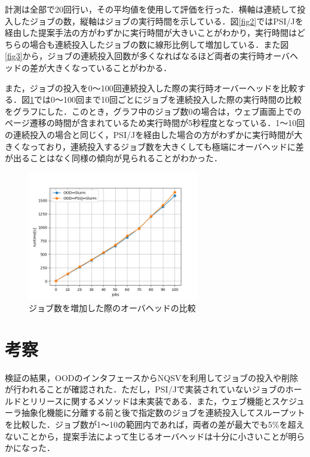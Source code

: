 \documentclass[a4paper,oneside,twocolumn,notitlepage,dvipdfmx]{jsarticle}
\begin{document}
計測は全部で20回行い，その平均値を使用して評価を行った．横軸は連続して投入したジョブの数，縦軸はジョブの実行時間を示している．図\ref{fig2}ではPSI/Jを経由した提案手法の方がわずかに実行時間が大きいことがわかり，実行時間はどちらの場合も連続投入したジョブの数に線形比例して増加している．また図\ref{fig3}から，ジョブの連続投入回数が多くなればなるほど両者の実行時オーバヘッドの差が大きくなっていることがわかる．\par
また，ジョブの投入を0～100回連続投入した際の実行時オーバーヘッドを比較する．図\ref{fig5}では0～100回まで10回ごとにジョブを連続投入した際の実行時間の比較をグラフにした．このとき，グラフ中のジョブ数0の場合は，ウェブ画面上でのページ遷移の時間が含まれているため実行時間が5秒程度となっている．1～10回の連続投入の場合と同じく，PSI/Jを経由した場合の方がわずかに実行時間が大きくなっており，連続投入するジョブ数を大きくしても極端にオーバヘッドに差が出ることはなく同様の傾向が見られることがわかった．\par

\begin{figure}[h]
  \centering
  \includegraphics[width=75mm]{./fig/100jobs.png}
  \caption{ジョブ数を増加した際のオーバヘッドの比較}
  \label{fig5}
\end{figure}

\section{考察}
検証の結果，OODのインタフェースからNQSVを利用してジョブの投入や削除が行われることが確認された．ただし，PSI/Jで実装されていないジョブのホールドとリリースに関するメソッドは未実装である．また，ウェブ機能とスケジューラ抽象化機能に分離する前と後で指定数のジョブを連続投入してスループットを比較した．ジョブ数が1～10の範囲内であれば，両者の差が最大でも5\%を超えないことから，提案手法によって生じるオーバヘッドは十分に小さいことが明らかになった．\par
\end{document}

